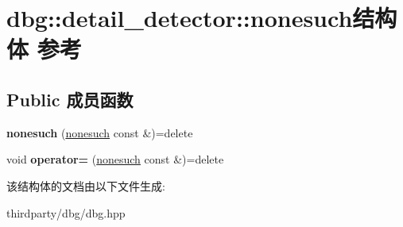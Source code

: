 \hypertarget{structdbg_1_1detail__detector_1_1nonesuch}{}\section{dbg\+:\+:detail\+\_\+detector\+:\+:nonesuch结构体 参考}
\label{structdbg_1_1detail__detector_1_1nonesuch}
\subsection*{Public 成员函数}
\begin{DoxyCompactItemize}
\item 
\mbox{\label{structdbg_1_1detail__detector_1_1nonesuch_a82c9bfc90b56b542819d8df5af7cebe6}} 
{\bfseries nonesuch} (\hyperlink{structdbg_1_1detail__detector_1_1nonesuch}{nonesuch} const \&)=delete
\item 
\mbox{\label{structdbg_1_1detail__detector_1_1nonesuch_af0d1b2ab32ace678e2c9d95684d1917b}} 
void {\bfseries operator=} (\hyperlink{structdbg_1_1detail__detector_1_1nonesuch}{nonesuch} const \&)=delete
\end{DoxyCompactItemize}


该结构体的文档由以下文件生成\+:\begin{DoxyCompactItemize}
\item 
thirdparty/dbg/dbg.\+hpp\end{DoxyCompactItemize}
